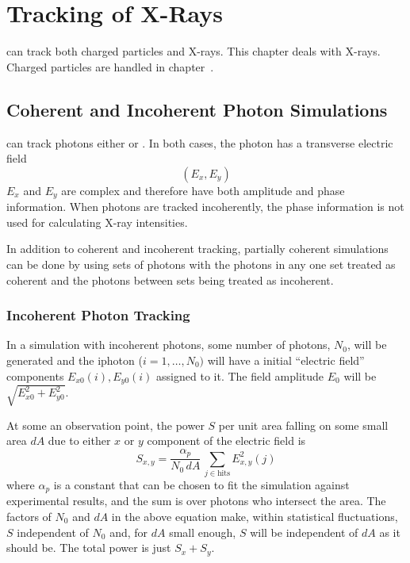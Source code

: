 \chapter{Tracking of X-Rays}
\label{c:xray.track}

\bmad can track both charged particles and X-rays. This chapter deals
with X-rays. Charged particles are handled in chapter~.

\section{Coherent and Incoherent Photon Simulations}
\label{s:coher.incoher}

\bmad can track photons either  or .
In both cases, the photon has a transverse electric field 
\begin{equation}
  (E_x, E_y)
\end{equation}
$E_x$ and $E_y$ are complex and therefore have both amplitude and phase information. When photons
are tracked incoherently, the phase information is not used for calculating X-ray intensities.

In addition to coherent and incoherent tracking, partially coherent simulations can be done by using
sets of photons with the photons in any one set treated as coherent and the photons between sets
being treated as incoherent.

\subsection{Incoherent Photon Tracking}
\label{s:incoher}

In a simulation with incoherent photons, some number of photons,
$N_0$, will be generated and the i\Th photon ($i = 1, \ldots, N_0)$
will have a initial ``electric field'' components $E_{x0}(i),
E_{y0}(i)$ assigned to it. The field amplitude $E_0$ will be
$\sqrt{E_{x0}^2 + E_{y0}^2}$.

At some an observation point, the power $S$ per unit area falling on
some small area $dA$ due to either $x$ or $y$ component of the
electric field is
\begin{equation}
  S_{x,y} = \frac{\alpha_p}{N_0 \, dA} \, \sum_{j \in \text{hits}} E_{x,y}^2(j)
  \label{panda1}
\end{equation}
where $\alpha_p$ is a constant that can be chosen to fit the
simulation against experimental results, and the sum is over photons
who intersect the area. The factors of $N_0$ and $dA$ in the above
equation make, within statistical fluctuations, $S$ independent of
$N_0$ and, for $dA$ small enough, $S$ will be independent of $dA$ as
it should be. The total power is just $S_x + S_y$.

